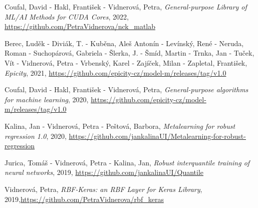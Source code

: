 \vspace{0.4em}
\noindent
Coufal, David - Hakl, František - Vidnerová, Petra, {\em General-purpose Library of ML/AI Methods for CUDA Cores}, 2022, \href{https://github.com/PetraVidnerova/nck_matlab}{ https://github.com/PetraVidnerova/nck\_matlab}

\vspace{0.4em}
\noindent
Berec, Luděk - Diviák, T. - Kuběna, Aleš Antonín - Levínský, René - Neruda, Roman - Suchopárová, Gabriela - Šlerka, J. - Šmíd, Martin - Trnka, Jan - Tuček, Vít - Vidnerová, Petra - Vrbenský, Karel - Zajíček, Milan - Zapletal, František, {\em Epicity}, 2021, \href{https://github.com/epicity-cz/model-m/releases/tag/v1.0}{https://github.com/epicity-cz/model-m/releases/tag/v1.0}

\vspace{0.4em}
\noindent
Coufal, David - Hakl, František - Vidnerová, Petra, {\em General-purpose algorithms for machine learning}, 2020, \href{https://github.com/epicity-cz/model-m/releases/tag/v1.0}{https://github.com/epicity-cz/model-m/releases/tag/v1.0}

\vspace{0.4em}
\noindent
Kalina, Jan - Vidnerová, Petra - Peštová, Barbora, {\em Metalearning for robust regression 1.0}, 2020, \href{https://github.com/jankalinaUI/Metalearning-for-robust-regression}{https://github.com/jankalinaUI/Metalearning-for-robust-regression}

\vspace{0.4em}
\noindent
Jurica, Tomáš - Vidnerová, Petra - Kalina, Jan, {\em Robust interquantile training of neural networks}, 2019, \href{https://github.com/jankalinaUI/Quantile}{https://github.com/jankalinaUI/Quantile}

\vspace{0.4em}
\noindent
Vidnerová, Petra, {\em RBF-Keras: an RBF Layer for Keras Library}, 2019,\newline \href{https://github.com/PetraVidnerova/rbf_keras}{https://github.com/PetraVidnerova/rbf\_keras}

\vspace{0.4em}
\noindent

